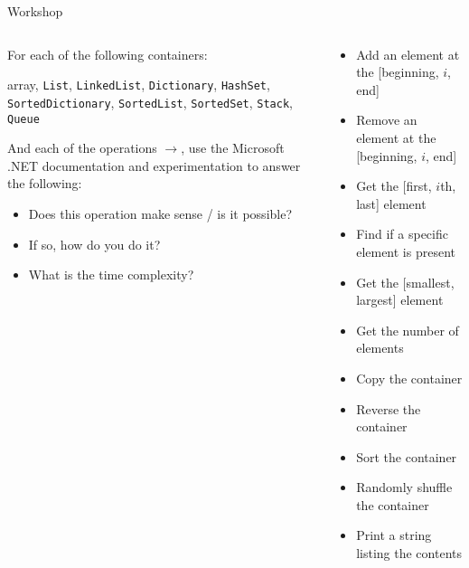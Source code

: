 \begin{frame}{Workshop}
    \footnotesize
    \begin{columns}
        \begin{column}{0.45\textwidth}
            For each of the following containers:
            
                array, \lstinline{List}, \lstinline{LinkedList},
                \lstinline{Dictionary}, \lstinline{HashSet},
                \lstinline{SortedDictionary}, \lstinline{SortedList},
                \lstinline{SortedSet}, \lstinline{Stack}, \lstinline{Queue}
                
            And each of the operations $\to$, use the Microsoft .NET documentation
            and experimentation to answer the following:
            
            \begin{itemize}
                \item Does this operation make sense / is it possible?
                \item If so, how do you do it?
                \item What is the time complexity?
            \end{itemize}
        \end{column}
        \begin{column}{0.55\textwidth}
            \begin{itemize}
                \item Add an element at the [beginning, $i$, end]
                \item Remove an element at the [beginning, $i$, end]
                \item Get the [first, $i$th, last] element
                \item Find if a specific element is present
                \item Get the [smallest, largest] element
                \item Get the number of elements
                \item Copy the container
                \item Reverse the container
                \item Sort the container
                \item Randomly shuffle the container
                \item Print a string listing the contents
            \end{itemize}
        \end{column}
    \end{columns}
\end{frame}


